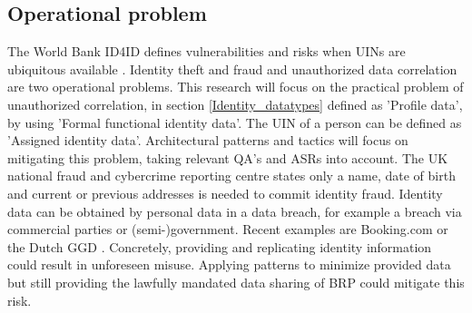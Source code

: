 \subsection{Operational problem}\label{OP}
The World Bank ID4ID defines vulnerabilities and risks when UINs are ubiquitous available \cite{WorldBank_protecting}. Identity theft and fraud and unauthorized data correlation are two operational problems. This research will focus on the practical problem of unauthorized correlation, in section \ref{Identity_datatypes} defined as 'Profile data', by using 'Formal functional identity data'. The UIN of a person can be defined as 'Assigned identity data'. Architectural patterns and tactics will focus on mitigating this problem, taking relevant QA's and ASRs into account. 
The UK national fraud and cybercrime reporting centre states only a name, date of birth and current or previous addresses is needed to commit identity fraud. \cite{Action_fraud}
Identity data can be obtained by personal data in a data breach, for example a breach via commercial parties or (semi-)government. Recent examples are Booking.com \cite{Booking_databreach} or the Dutch GGD \cite{GGD_databreach}.
Concretely, providing and replicating identity information could result in unforeseen misuse. Applying patterns to minimize provided data but still providing the lawfully mandated data sharing of BRP could mitigate this risk.
%
